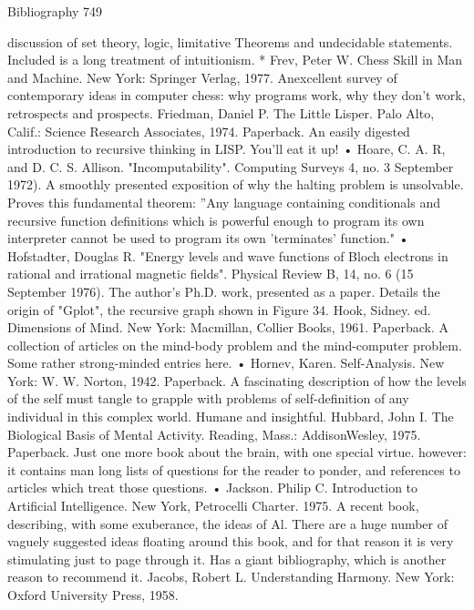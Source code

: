 Bibliography                                                                          749

  discussion of set theory, logic, limitative Theorems and undecidable statements.
  Included is a long treatment of intuitionism.        *
Frev, Peter W. Chess Skill in Man and Machine. New York: Springer Verlag, 1977.
  Anexcellent survey of contemporary ideas in computer chess: why programs work, why
  they don't work, retrospects and prospects.
Friedman, Daniel P. The Little Lisper. Palo Alto, Calif.: Science Research Associates,
  1974. Paperback. An easily digested introduction to recursive thinking in LISP. You'll
  eat it up!
•         Hoare, C. A. R, and D. C. S. Allison. "Incomputability". Computing Surveys 4,
     no. 3 September 1972). A smoothly presented exposition of why the halting problem
     is unsolvable. Proves this fundamental theorem: ''Any language containing
     conditionals and recursive function definitions which is powerful enough to program
     its own interpreter cannot be used to program its own 'terminates' function."
•         Hofstadter, Douglas R. "Energy levels and wave functions of Bloch electrons in
     rational and irrational magnetic fields". Physical Review B, 14, no. 6 (15 September
     1976). The author's Ph.D. work, presented as a paper. Details the origin of "Gplot",
     the recursive graph shown in Figure 34.
Hook, Sidney. ed. Dimensions of Mind. New York: Macmillan, Collier Books, 1961.
  Paperback. A collection of articles on the mind-body problem and the mind-computer
  problem. Some rather strong-minded entries here.
• Hornev, Karen. Self-Analysis. New York: W. W. Norton, 1942. Paperback. A
  fascinating description of how the levels of the self must tangle to grapple with
  problems of self-definition of any individual in this complex world. Humane and
  insightful.
Hubbard, John I. The Biological Basis of Mental Activity. Reading, Mass.:
  AddisonWesley, 1975. Paperback. Just one more book about the brain, with one special
  virtue. however: it contains man long lists of questions for the reader to ponder, and
  references to articles which treat those questions.
• Jackson. Philip C. Introduction to Artificial Intelligence. New York, Petrocelli Charter.
  1975. A recent book, describing, with some exuberance, the ideas of Al. There are a
  huge number of vaguely suggested ideas floating around this book, and for that reason
  it is very stimulating just to page through it. Has a giant bibliography, which is another
  reason to recommend it.
Jacobs, Robert L. Understanding Harmony. New York: Oxford University Press, 1958.

